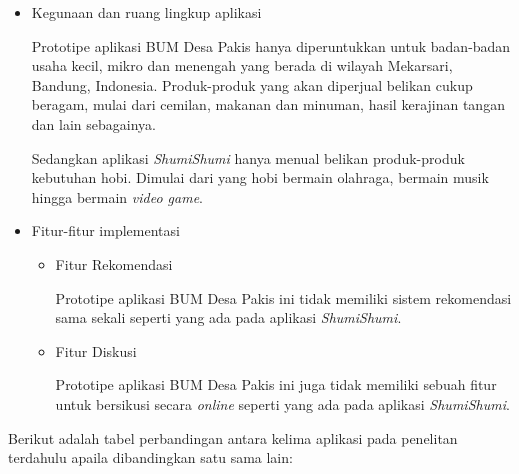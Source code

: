 \documentclass[a4paper]{article}
\begin{document}
\begin{enumerate}
    \begin{itemize}
        \item Kegunaan dan ruang lingkup aplikasi

        Prototipe aplikasi BUM Desa Pakis hanya diperuntukkan untuk badan-badan usaha kecil, mikro dan menengah yang berada di wilayah Mekarsari, Bandung, Indonesia. Produk-produk yang akan diperjual belikan cukup beragam, mulai dari cemilan, makanan dan minuman, hasil kerajinan tangan dan lain sebagainya\autocite{bum-mekarsari}.

        Sedangkan aplikasi \textit{ShumiShumi} hanya menual belikan produk-produk kebutuhan hobi. Dimulai dari yang hobi bermain olahraga, bermain musik hingga bermain \textit{video game}.

        \item Fitur-fitur implementasi

        \begin{itemize}
            \item Fitur Rekomendasi

            Prototipe aplikasi BUM Desa Pakis ini tidak memiliki sistem rekomendasi sama sekali seperti yang ada pada aplikasi \textit{ShumiShumi}\autocite{bum-mekarsari}.

            \item Fitur Diskusi

            Prototipe aplikasi BUM Desa Pakis ini juga tidak memiliki sebuah fitur untuk bersikusi secara \textit{online} seperti yang ada pada aplikasi \textit{ShumiShumi}\autocite{bum-mekarsari}.

        \end{itemize}

    \end{itemize}

\end{enumerate}

Berikut adalah tabel perbandingan antara kelima aplikasi pada penelitan terdahulu apaila dibandingkan satu sama lain:
\end{document}
